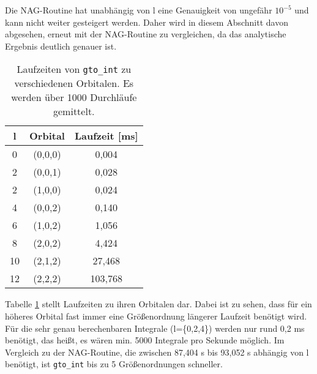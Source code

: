 Die NAG-Routine hat unabhängig von l eine Genauigkeit 
von ungefähr $10^{-5}$ und kann nicht weiter gesteigert 
werden. Daher wird in diesem Abschnitt davon abgesehen, 
erneut mit der NAG-Routine zu vergleichen, da das 
analytische Ergebnis deutlich genauer ist.
%
\begin{table}[H] \centering
	\caption{Laufzeiten von \texttt{gto\_int} zu verschiedenen 
	Orbitalen. Es werden über 1000 Durchläufe 
	gemittelt.} \vspace{0.2cm}
	\begin{threeparttable} 
		\begin{tabular}{c|c||c}
		l&Orbital&Laufzeit [ms]\\ \hline
		0&(0,0,0)& 0,004\\
		2&(0,0,1)& 0,028\\
		2&(1,0,0)& 0,024\\
		4&(0,0,2)& 0,140\\
		6&(1,0,2)& 1,056\\
		8&(2,0,2)& 4,424\\
		10&(2,1,2)& 27,468\\
		12&(2,2,2)& 103,768\\
		\end{tabular}
	\end{threeparttable}
	\label{tab:norm:orbital_time}
\end{table}
% 
Tabelle \ref{tab:norm:orbital_time} stellt Laufzeiten  
zu ihren Orbitalen dar. Dabei ist zu sehen, dass für 
ein höheres Orbital fast immer eine Größenordnung 
längerer Laufzeit benötigt wird. Für die sehr genau 
berechenbaren Integrale (l=\{0,2,4\}) werden nur rund 
0,2 ms benötigt, das heißt, es wären min. 5000 Integrale pro 
Sekunde möglich. Im Vergleich zu der NAG-Routine, die 
zwischen 87,404 s bis 93,052 s abhängig von l benötigt, 
ist \texttt{gto\_int} bis zu 5 Größenordnungen schneller. 
%
%
%

